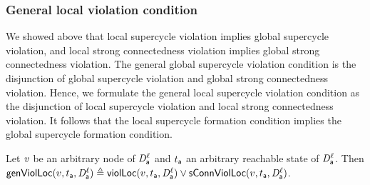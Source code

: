 



\subsubsection{General local violation condition}

We showed above that local supercycle violation implies global supercycle violation, and local
strong connectedness violation implies global strong connectedness violation.  The general global
supercycle violation condition is the disjunction of global supercycle violation and global strong
connectedness violation.  Hence, we formulate the general local supercycle violation condition as the
disjunction of local supercycle violation and local strong connectedness violation.  It follows that
the local supercycle formation condition implies the global supercycle formation condition.


\begin{definition}
\label{def:locFormation.violation}
\label{defn:locFormation.violation}
Let $\mathit{v}$ be an arbitrary node of $\mathit{D}_{\mathsf{a}}^{\ell}$ and $t_{\mathsf{a}}$ an arbitrary reachable state of $\mathit{D}_{\mathsf{a}}^{\ell}$.
Then $\mathsf{genViolLoc}(v,t_{\mathsf{a}},\mathit{D}_{\mathsf{a}}^{\ell})  \triangleq \mathsf{violLoc}(v,t_{\mathsf{a}},\mathit{D}_{\mathsf{a}}^{\ell}) \lor \mathsf{sConnViolLoc}(v,t_{\mathsf{a}},\mathit{D}_{\mathsf{a}}^{\ell})$.
\end{definition}
%

